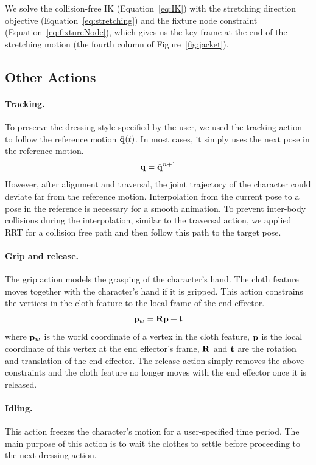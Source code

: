 We solve the collision-free IK (Equation~\ref{eq:IK}) with the stretching direction objective (Equation~\ref{eq:stretching}) and the fixture node constraint (Equation~\ref{eq:fixtureNode}), which gives us the key frame at the end of the stretching motion (the fourth column of Figure~\ref{fig:jacket}).

\subsection{Other Actions}

\paragraph{Tracking.} To preserve the dressing style specified by the user, we used the tracking action to follow the reference motion $\hat{\mathbf{q}}(t)$. In most cases, it simply uses the next pose in the reference motion.
\begin{displaymath}
\mathbf{q} = \hat{\mathbf{q}}^{n+1}
\end{displaymath}
However, after alignment and traversal, the joint trajectory of the character could deviate far from the reference motion. Interpolation from the current pose to a pose in the reference is necessary for a smooth animation. To prevent inter-body collisions during the interpolation, similar to the traversal action, we applied RRT for a collision free path and then follow this path to the target pose. 


\paragraph{Grip and release.}
The grip action models the grasping of the character's hand. The cloth feature moves together with the character's hand if it is gripped. This action constrains the vertices in the cloth feature to the local frame of the end effector.
\begin{displaymath}
\mathbf{p}_w = \mathbf{Rp} + \mathbf{t}
\end{displaymath}
where $\mathbf{p}_w$ is the world coordinate of a vertex in the cloth feature, $\mathbf{p}$ is the local coordinate of this vertex at the end effector's frame, $\mathbf{R}$ and $\mathbf{t}$ are the rotation and translation of the end effector. The release action simply removes the above constraints and the cloth feature no longer moves with the end effector once it is released.

\paragraph{Idling.} This action freezes the character's motion for a user-specified time period. The main purpose of this action is to wait the clothes to settle before proceeding to the next dressing action.

